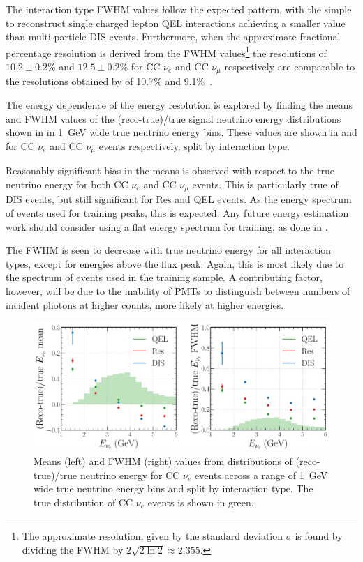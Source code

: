 The interaction type FWHM values follow the expected pattern, with the simple to reconstruct
single charged lepton QEL interactions achieving a smaller value than multi-particle DIS events.
Furthermore, when the approximate fractional percentage resolution is derived from the FWHM
values\footnote{The approximate resolution, given by the standard deviation $\sigma$ is found by
dividing the FWHM by $2\sqrt{2\ln2}\approx2.355$.} the resolutions of $10.2\pm0.2\%$ and
$12.5\pm0.2\%$ for CC $\nu_{e}$ and CC $\nu_{\mu}$ respectively are comparable to the resolutions
obtained by \nova of 10.7\% and 9.1\%~\cite{acero2019}.

The energy dependence of the energy resolution is explored by finding the means and FWHM values of
the (reco-true)/true signal neutrino energy distributions shown in
 in \SI{1}{GeV} wide true neutrino energy bins. These
values are shown in  and  for CC
$\nu_{e}$ and CC $\nu_{\mu}$ events respectively, split by interaction type.

Reasonably significant bias in the means is observed with respect to the true neutrino energy for
both CC $\nu_{e}$ and CC $\nu_{\mu}$ events. This is particularly true of DIS events, but still
significant for Res and QEL events. As the energy spectrum of events used for training peaks, this
is expected. Any future energy estimation work should consider using a flat energy spectrum for
training, as done in .

The FWHM is seen to decrease with true neutrino energy for all interaction types, except for
energies above the flux peak. Again, this is most likely due to the spectrum of events used in the
training sample. A contributing factor, however, will be due to the inability of PMTs to
distinguish between numbers of incident photons at higher counts, more likely at higher energies.

\begin{figure} %
    \includegraphics[width=\textwidth]{diagrams/7-results/final_energy_nuel.pdf}
    \caption[Means and FWHM values of $\nu_{e}$ energy distributions]
    {Means (left) and FWHM (right) values from distributions of (reco-true)/true neutrino energy
        for CC $\nu_{e}$ events across a range of \SI{1}{GeV} wide true neutrino energy bins and
        split by interaction type. The true distribution of CC $\nu_{e}$ events is shown in
        green.}
    \label{fig:final_energy_nuel}
\end{figure}

